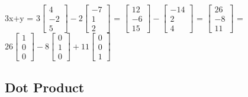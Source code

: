     \begin{tbox}
        3x+y
        = $3\begin{bmatrix}
            4 \\
            -2 \\
            5
        \end{bmatrix} - 2
        \begin{bmatrix}
            -7 \\
            1 \\
            2
        \end{bmatrix}$
        = $\begin{bmatrix}
            12 \\
            -6 \\
            15
        \end{bmatrix} -
        \begin{bmatrix}
            -14 \\
            2 \\
            4
        \end{bmatrix}$
        = $\begin{bmatrix}
            26 \\
            -8 \\
            11
        \end{bmatrix}$
        = $26\begin{bmatrix}
            1 \\
            0 \\
            0
        \end{bmatrix}
        - 8\begin{bmatrix}
            0 \\
            1 \\
            0
        \end{bmatrix}
        + 11\begin{bmatrix}
            0 \\
            0 \\
            1
        \end{bmatrix}$
    \end{tbox}

    \vspace{0.5cm}





\subsection{ Dot Product }

